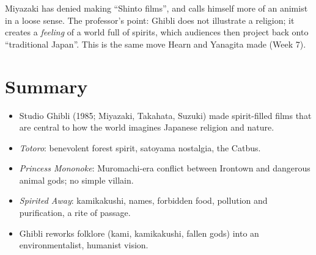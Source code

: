 \begin{aside}
Miyazaki has denied making ``Shinto films'', and calls himself more of an animist in a
loose sense. The professor's point: Ghibli does not illustrate a religion; it creates a
\emph{feeling} of a world full of spirits, which audiences then project back onto
``traditional Japan''. This is the same move Hearn and Yanagita made (Week 7).
\end{aside}

\section*{Summary}
\begin{itemize}
  \item Studio Ghibli (1985; Miyazaki, Takahata, Suzuki) made spirit-filled films that are
        central to how the world imagines Japanese religion and nature.
  \item \emph{Totoro}: benevolent forest spirit, satoyama nostalgia, the Catbus.
  \item \emph{Princess Mononoke}: Muromachi-era conflict between Irontown and dangerous
        animal gods; no simple villain.
  \item \emph{Spirited Away}: kamikakushi, names, forbidden food, pollution and
        purification, a rite of passage.
  \item Ghibli reworks folklore (kami, kamikakushi, fallen gods) into an
        environmentalist, humanist vision.
\end{itemize}
